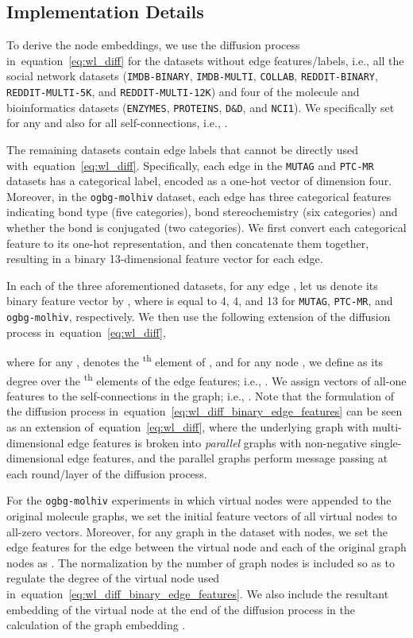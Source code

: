 \documentclass[table]{article} \usepackage{iclr2021_conference,times}
\def\eqref#1{equation~\ref{#1}}
\begin{document}
\subsection{Implementation Details}\label{sec:appx:implementation}



To derive the node embeddings, we use the diffusion process in~\eqref{eq:wl_diff} for the datasets without edge features/labels, i.e., all the social network datasets (\texttt{IMDB-BINARY}, \texttt{IMDB-MULTI}, \texttt{COLLAB}, \texttt{REDDIT-BINARY}, \texttt{REDDIT-MULTI-5K}, and \texttt{REDDIT-MULTI-12K}) and four of the molecule and bioinformatics datasets (\texttt{ENZYMES}, \texttt{PROTEINS}, \texttt{D\&D}, and \texttt{NCI1}). We specifically set  for any  and also for all self-connections, i.e., .

The remaining datasets contain edge labels that cannot be directly used with~\eqref{eq:wl_diff}. Specifically, each edge in the \texttt{MUTAG} and \texttt{PTC-MR} datasets has a categorical label, encoded as a one-hot vector of dimension four. Moreover, in the \texttt{ogbg-molhiv} dataset, each edge has three categorical features indicating bond type (five categories), bond stereochemistry (six categories) and whether the bond is conjugated (two categories). We first convert each categorical feature to its one-hot representation, and then concatenate them together, resulting in a binary 13-dimensional feature vector for each edge.

In each of the three aforementioned datasets, for any edge , let us denote its binary feature vector by , where  is equal to 4, 4, and 13 for \texttt{MUTAG}, \texttt{PTC-MR}, and \texttt{ogbg-molhiv}, respectively. We then use the following extension of the diffusion process in~\eqref{eq:wl_diff},

where for any ,  denotes the \textsuperscript{th} element of , and for any node , we define  as its degree over the \textsuperscript{th} elements of the edge features; i.e., . We assign vectors of all-one features to the self-connections in the graph; i.e., . Note that the formulation of the diffusion process in~\eqref{eq:wl_diff_binary_edge_features} can be seen as an extension of~\eqref{eq:wl_diff}, where the underlying graph with multi-dimensional edge features is broken into  \emph{parallel} graphs with non-negative single-dimensional edge features, and the parallel graphs perform message passing at each round/layer of the diffusion process.

For the \texttt{ogbg-molhiv} experiments in which virtual nodes were appended to the original molecule graphs, we set the initial feature vectors of all virtual nodes to all-zero vectors. Moreover, for any graph  in the dataset with  nodes, we set the edge features for the edge between the virtual node  and each of the original graph nodes  as . The normalization by the number of graph nodes is included so as to regulate the degree of the virtual node used in~\eqref{eq:wl_diff_binary_edge_features}. We also include the resultant embedding of the virtual node at the end of the diffusion process in the calculation of the graph embedding .
\end{document}
